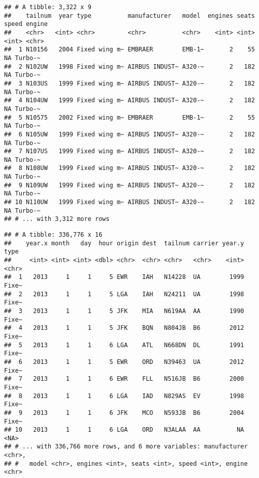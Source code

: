 \documentclass[
]{article}
\newenvironment{Shaded}{\begin{snugshade}}{\end{snugshade}}
\newcommand{\DataTypeTok}[1]{\textcolor[rgb]{0.13,0.29,0.53}{#1}}
\newcommand{\KeywordTok}[1]{\textcolor[rgb]{0.13,0.29,0.53}{\textbf{#1}}}
\newcommand{\NormalTok}[1]{#1}
\newcommand{\OperatorTok}[1]{\textcolor[rgb]{0.81,0.36,0.00}{\textbf{#1}}}
\newcommand{\StringTok}[1]{\textcolor[rgb]{0.31,0.60,0.02}{#1}}
\begin{document}
\begin{verbatim}
## # A tibble: 3,322 x 9
##    tailnum  year type          manufacturer   model  engines seats speed engine 
##    <chr>   <int> <chr>         <chr>          <chr>    <int> <int> <int> <chr>  
##  1 N10156   2004 Fixed wing m~ EMBRAER        EMB-1~       2    55    NA Turbo-~
##  2 N102UW   1998 Fixed wing m~ AIRBUS INDUST~ A320-~       2   182    NA Turbo-~
##  3 N103US   1999 Fixed wing m~ AIRBUS INDUST~ A320-~       2   182    NA Turbo-~
##  4 N104UW   1999 Fixed wing m~ AIRBUS INDUST~ A320-~       2   182    NA Turbo-~
##  5 N10575   2002 Fixed wing m~ EMBRAER        EMB-1~       2    55    NA Turbo-~
##  6 N105UW   1999 Fixed wing m~ AIRBUS INDUST~ A320-~       2   182    NA Turbo-~
##  7 N107US   1999 Fixed wing m~ AIRBUS INDUST~ A320-~       2   182    NA Turbo-~
##  8 N108UW   1999 Fixed wing m~ AIRBUS INDUST~ A320-~       2   182    NA Turbo-~
##  9 N109UW   1999 Fixed wing m~ AIRBUS INDUST~ A320-~       2   182    NA Turbo-~
## 10 N110UW   1999 Fixed wing m~ AIRBUS INDUST~ A320-~       2   182    NA Turbo-~
## # ... with 3,312 more rows
\end{verbatim}

\begin{Shaded}
\end{Shaded}

\begin{verbatim}
## # A tibble: 336,776 x 16
##    year.x month   day  hour origin dest  tailnum carrier year.y type 
##     <int> <int> <int> <dbl> <chr>  <chr> <chr>   <chr>    <int> <chr>
##  1   2013     1     1     5 EWR    IAH   N14228  UA        1999 Fixe~
##  2   2013     1     1     5 LGA    IAH   N24211  UA        1998 Fixe~
##  3   2013     1     1     5 JFK    MIA   N619AA  AA        1990 Fixe~
##  4   2013     1     1     5 JFK    BQN   N804JB  B6        2012 Fixe~
##  5   2013     1     1     6 LGA    ATL   N668DN  DL        1991 Fixe~
##  6   2013     1     1     5 EWR    ORD   N39463  UA        2012 Fixe~
##  7   2013     1     1     6 EWR    FLL   N516JB  B6        2000 Fixe~
##  8   2013     1     1     6 LGA    IAD   N829AS  EV        1998 Fixe~
##  9   2013     1     1     6 JFK    MCO   N593JB  B6        2004 Fixe~
## 10   2013     1     1     6 LGA    ORD   N3ALAA  AA          NA <NA> 
## # ... with 336,766 more rows, and 6 more variables: manufacturer <chr>,
## #   model <chr>, engines <int>, seats <int>, speed <int>, engine <chr>
\end{verbatim}
\end{document}
